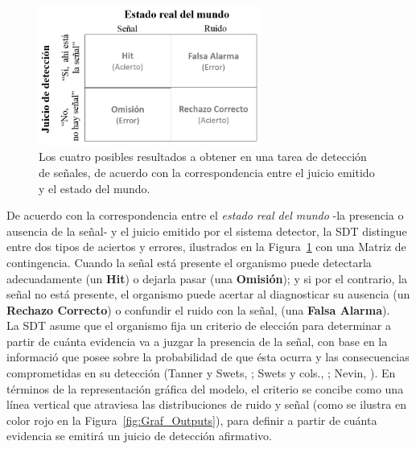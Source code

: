 \begin{figure}[h]
\centering
\includegraphics[width=0.65\textwidth]{Figures/Matriz_Outputs} 
\decoRule
\caption[Matriz de contingencia: Resultados a obtener en una tarea de detección]{Los cuatro posibles resultados a obtener en una tarea de detección de señales, de acuerdo con la correspondencia entre el juicio emitido y el estado del mundo.}
\label{fig:Mat_Output}
\end{figure}

De acuerdo con la correspondencia entre el \textit{estado real del mundo} -la presencia o ausencia de la señal- y el juicio emitido por el sistema detector, la SDT distingue entre dos tipos de aciertos y errores, ilustrados en la Figura~\ref{fig:Mat_Output} con una Matriz de contingencia. Cuando la señal está presente el organismo puede detectarla adecuadamente (un \textbf{Hit}) o dejarla pasar (una \textbf{Omisión}); y si por el contrario, la señal no está presente, el organismo puede acertar al diagnosticar su ausencia (un \textbf{Rechazo Correcto}) o confundir el ruido con la señal, (una \textbf{Falsa Alarma}).\\

La SDT asume que el organismo fija un criterio de elección para determinar a partir de cuánta evidencia va a juzgar la presencia de la señal, con base en la informació que posee sobre la probabilidad de que ésta ocurra y las consecuencias comprometidas en su detección (Tanner y Swets, \citeyear{Tanner1954}; Swets y cols., \citeyear{Swets1961}; Nevin, \citeyear{Nevin1969}). En términos de la representación gráfica del modelo, el criterio se concibe como una línea vertical que atraviesa las distribuciones de ruido y señal (como se ilustra en color rojo en la Figura~\ref{fig:Graf_Outputs}), para definir a partir de cuánta evidencia se emitirá un juicio de detección afirmativo.

